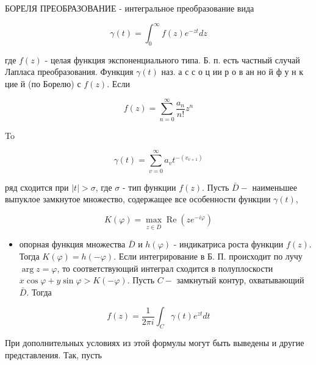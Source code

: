 \documentclass[10pt]{article}
\begin{document}
БОРЕЛЯ ПРЕОБРАЗОВАНИЕ - интегральное преобразование вида



\[

\gamma(t)=\int_{0}^{\infty} f(z) e^{-z t} d z

\]



где $f(z)$ - целая функция экспоненциального типа. Б. п. есть частный случай Лапласа преобразования. Функция $\gamma(t)$ наз. а с с о ц ии р о в ан но й ф у н к цие й (по Борелю) с $f(z)$. Если



\[

f(z)=\sum_{n=0}^{\infty} \frac{a_{n}}{n !} z^{n}

\]



To



\[

\gamma(t)=\sum_{v=0}^{\infty} a_{v} t^{-\left(v_{v+1}\right)}

\]



ряд сходится при $|t|>\sigma$, где $\sigma$ - тип функции $f(z)$. Пусть $\bar{D}-$ наименьшее выпуклое замкнутое множество, содержащее все особенности функции $\gamma(t)$,



\[

K(\varphi)=\max _{z \in \bar{D}} \operatorname{Re}\left(z e^{-i \varphi}\right)

\]



\begin{itemize}

  \item опорная функция множества $\bar{D}$ и $h(\varphi)$ - индикатриса роста функции $f(z)$. Тогда $K(\varphi)=h(-\varphi)$. Если интегрирование в Б. П. происходит по лучу $\arg z=\varphi$, то соответствующий интеграл сходится в полуплоскости $x \cos \varphi+y \sin \varphi>K(-\varphi)$. Пусть $C-$ замкнутый контур, охватывающий $\bar{D}$. Тогда

\end{itemize}



\[

f(z)=\frac{1}{2 \pi i} \int_{C} \gamma(t) e^{z t} d t

\]



При дополнительных условиях из этой формулы могут быть выведены и другие представления. Так, пусть
\end{document}
